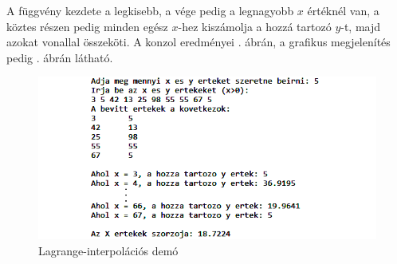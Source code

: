 A függvény kezdete a legkisebb, a vége pedig a legnagyobb $x$ értéknél van, a köztes részen pedig minden egész $x$-hez kiszámolja a hozzá tartozó $y$-t, majd azokat vonallal összeköti. A konzol eredményei . ábrán, a grafikus megjelenítés pedig . ábrán látható.

\begin{figure}[h]
\centering
\includegraphics[scale=0.9]{kepek/lagrange_imp.png}
\caption{Lagrange-interpolációs demó}
\label{fig:lagrange_imp}
\end{figure}


